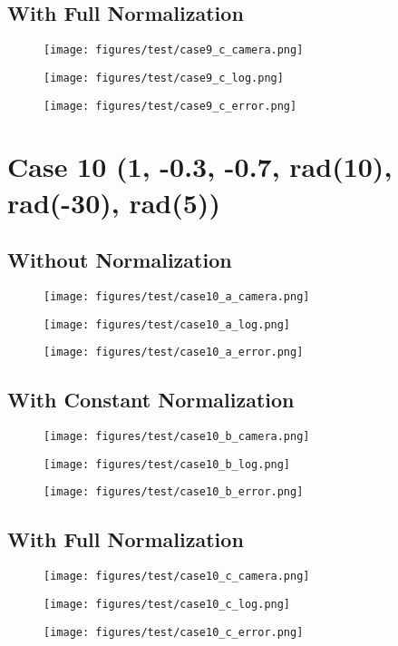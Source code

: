 \subsection{With Full Normalization}
\begin{figure}[ht!] \centering \texttt{[image: figures/test/case9\_c\_camera.png]} \end{figure}
\begin{figure}[ht!] \centering \texttt{[image: figures/test/case9\_c\_log.png]} \end{figure}
\begin{figure}[ht!] \centering \texttt{[image: figures/test/case9\_c\_error.png]} \end{figure}
\clearpage

\section{Case 10 (1, -0.3, -0.7, rad(10), rad(-30), rad(5))}
\subsection{Without Normalization}
\begin{figure}[ht!] \centering \texttt{[image: figures/test/case10\_a\_camera.png]} \end{figure}
\begin{figure}[ht!] \centering \texttt{[image: figures/test/case10\_a\_log.png]} \end{figure}
\begin{figure}[ht!] \centering \texttt{[image: figures/test/case10\_a\_error.png]} \end{figure}
\clearpage
\subsection{With Constant Normalization}
\begin{figure}[ht!] \centering \texttt{[image: figures/test/case10\_b\_camera.png]} \end{figure}
\begin{figure}[ht!] \centering \texttt{[image: figures/test/case10\_b\_log.png]} \end{figure}
\begin{figure}[ht!] \centering \texttt{[image: figures/test/case10\_b\_error.png]} \end{figure}
\clearpage
\subsection{With Full Normalization}
\begin{figure}[ht!] \centering \texttt{[image: figures/test/case10\_c\_camera.png]} \end{figure}
\begin{figure}[ht!] \centering \texttt{[image: figures/test/case10\_c\_log.png]} \end{figure}
\begin{figure}[ht!] \centering \texttt{[image: figures/test/case10\_c\_error.png]} \end{figure}
\clearpage

